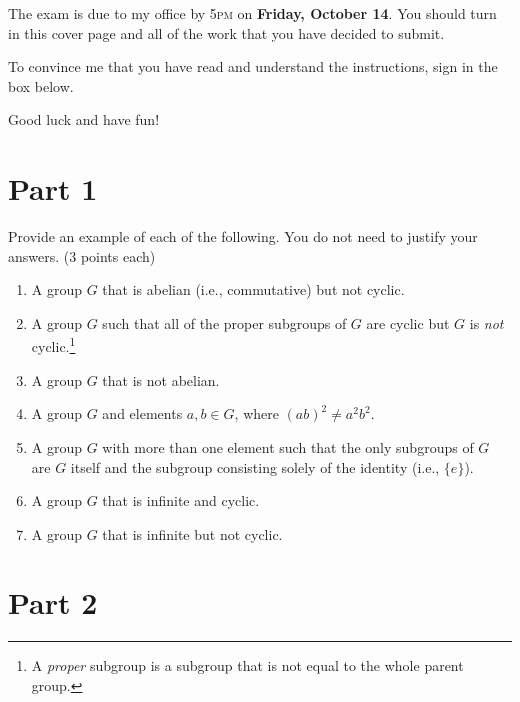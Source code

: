 \documentclass[11pt]{article}
\theoremstyle{definition}
\begin{document}
The exam is due to my office by 5\textsc{pm} on \textbf{Friday, October 14}.  You should turn in this cover page and all of the work that you have decided to submit.

\bigskip

To convince me that you have read and understand the instructions, sign in the box below.

\bigskip


\bigskip

Good luck and have fun!

\newpage

\section*{Part 1}

Provide an example of each of the following.  You do not need to justify your answers. (3 points each)

\begin{enumerate}

\item A group $G$ that is abelian (i.e., commutative) but not cyclic.

\item A group $G$ such that all of the proper subgroups of $G$ are cyclic but $G$ is \emph{not} cyclic.\footnote{A \emph{proper} subgroup is a subgroup that is not equal to the whole parent group.}

\item A group $G$ that is not abelian. 

\item A group $G$ and elements $a,b \in G$, where $(ab)^2\neq a^2b^2$.

\item A group $G$ with more than one element such that the only subgroups of $G$ are $G$ itself and the subgroup consisting solely of the identity (i.e., $\{e\}$).

\item A group $G$ that is infinite and cyclic.

\item A group $G$ that is infinite but not cyclic.

\end{enumerate}

\section*{Part 2}
\end{document}
